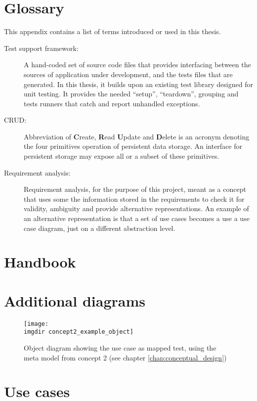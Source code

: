 \chapter{Glossary}
\label{appendix:glossary}
This appendix contains a list of terms introduced or used in this thesis.
\begin{description}
  \item[Test support framework:] A hand-coded set of source code files that provides interfacing between the sources of application under development, and the tests files that are generated. In this thesis, it builds upon an existing test library designed for unit testing. It provides the needed ``setup'', ``teardown'', grouping and tests runners that catch and report unhandled exceptions.
  \item[CRUD:] Abbreviation of \textbf{C}reate, \textbf{R}ead \textbf{U}pdate and \textbf{D}elete is an acronym denoting the four primitives operation of persistent data storage. An interface for persistent storage may expose all or a subset of these primitives.
  \item[Requirement analysis:] Requirement analysis, for the purpose of this project, meant as a concept that uses some the information stored in the requirements to check it for validity, ambiguity and provide alternative representations. An example of an alternative representation is that a set of use cases becomes a use a use case diagram, just on a different abstraction level.
\end{description}

\chapter{Handbook}

\chapter{Additional diagrams}

\begin{figure}[!htbp]
  \centering
  \texttt{[image: \\imgdir concept2\_example\_object]}
  \caption{Object diagram showing the use case as mapped test, using the meta model from concept 2 (see chapter \ref{chap:conceptual_design})}
  \label{fig:concept2_example_object}
\end{figure}

\chapter{Use cases}
\label{appendix:use-cases}


